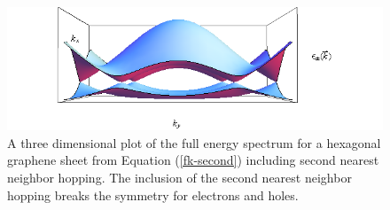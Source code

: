 			\begin{figure}[h]
				\centerline{\includegraphics[scale=0.6]{images/tb-second}}
				\caption{A three dimensional plot of the full energy spectrum for a hexagonal graphene sheet from Equation (\ref{fk-second}) including second nearest neighbor hopping. The inclusion of the second nearest neighbor hopping breaks the symmetry for electrons and holes.}
				\label{introduction-fk-plot-second}
			\end{figure}
